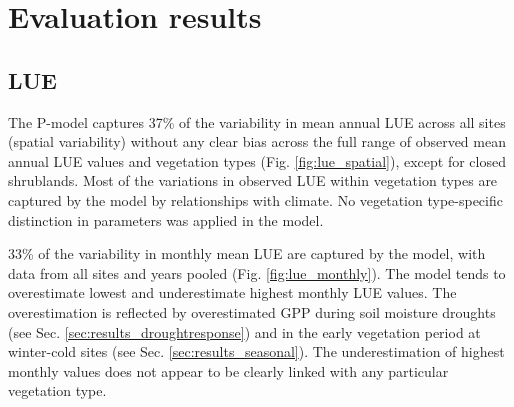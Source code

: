 \documentclass{myreport}
\begin{document}
\section{Evaluation results}
\label{sec:results}

\subsection{LUE}

The P-model captures 37\% of the variability in mean annual LUE across all sites (spatial variability) without any clear bias across the full range of observed mean annual LUE values and vegetation types (Fig. \ref{fig:lue_spatial}), except for closed shrublands. Most of the variations in observed LUE within vegetation types are captured by the model by relationships with climate. No vegetation type-specific distinction in parameters was applied in the model. 

33\% of the variability in monthly mean LUE are captured by the model, with data from all sites and years pooled (Fig. \ref{fig:lue_monthly}). The model tends to overestimate lowest and underestimate highest monthly LUE values. The overestimation is reflected by overestimated GPP during soil moisture droughts (see Sec. \ref{sec:results_droughtresponse}) and in the early vegetation period at winter-cold sites (see Sec. \ref{sec:results_seasonal}). The underestimation of highest monthly values does not appear to be clearly linked with any particular vegetation type.
\end{document}
